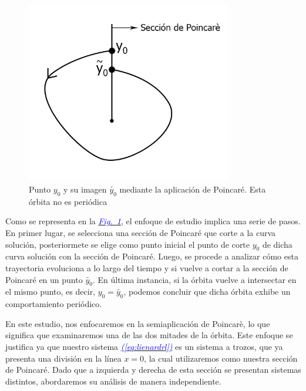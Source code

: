 \documentclass[12pt,a4paper]{report} %
\newcommand{\fref}[1]{\hyperref[#1]{\textcolor{blue}{\textit{Fig.~\ref*{#1}}}}}
\newcommand{\eref}[1]{\hyperref[#1]{\textcolor{blue}{\textit{(\ref*{#1})}}}}
\begin{document}
	\begin{figure}[h]
		\centering
		\includegraphics[width=0.8\textwidth]{aplipoincare2.jpg}
		\caption{Punto $y_0$ y su imagen $\tilde{y_0}$ mediante la aplicación de Poincaré. Esta órbita no es periódica}
		\label{fig:aplipoincare2}
	\end{figure}\smallskip

\noindent Como se representa en la \fref{fig:aplipoincare2}, el enfoque de estudio implica una serie de pasos. En primer lugar, se selecciona una sección de Poincaré que corte a la curva solución, posteriormete se elige como punto inicial el punto de corte $y_0$ de dicha curva solución con la sección de Poincaré. Luego, se procede a analizar cómo esta trayectoria evoluciona a lo largo del tiempo y si vuelve a cortar a la sección de Poincaré en un punto $\tilde{y_0}$. En última instancia, si la órbita vuelve a intersectar en el mismo punto, es decir, $y_0=\tilde{y_0}$, podemos concluir que dicha órbita exhibe un comportamiento periódico.

	\newpage
	
	En este estudio, nos enfocaremos en la semiaplicación de Poincarè, lo que significa que examinaremos una de las dos mitades de la órbita. Este enfoque se justifica ya que nuestro sistema \eref{eq:lienardrl} es un sistema a trozos, que ya presenta una división en la línea $x=0$, la cual utilizaremos como nuestra sección de Poincaré. Dado que a izquierda y derecha de esta sección se presentan sistemas distintos, abordaremos su análisis de manera independiente.
	
\end{document}
